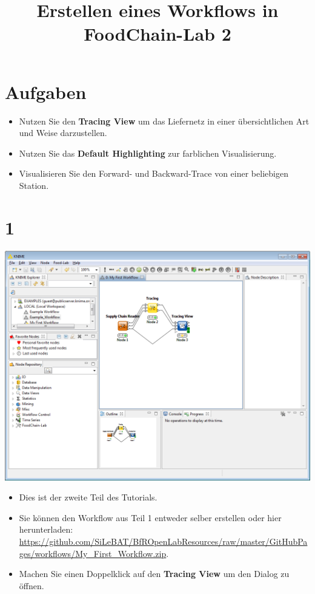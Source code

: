 \documentclass{beamer}
\title{Erstellen eines Workflows in FoodChain-Lab 2}
\date{}
\begin{document}
\maketitle

\section{Aufgaben}
\begin{frame}
	\begin{itemize}
		\item Nutzen Sie den \textbf{Tracing View} um das Liefernetz in einer übersichtlichen Art und Weise darzustellen.
		\item Nutzen Sie das \textbf{Default Highlighting} zur farblichen Visualisierung.
		\item Visualisieren Sie den Forward- und Backward-Trace von einer beliebigen Station.
	\end{itemize}
\end{frame}
 
\section{1}
\begin{frame}
	\begin{center}
  		\includegraphics[height=0.5\textheight]{1.png}
	\end{center}
	\begin{itemize}
		\item Dies ist der zweite Teil des Tutorials.
		\item Sie können den Workflow aus Teil 1 entweder selber erstellen oder hier herunterladen: \url{https://github.com/SiLeBAT/BfROpenLabResources/raw/master/GitHubPages/workflows/My_First_Workflow.zip}.
		\item Machen Sie einen Doppelklick auf den \textbf{Tracing View} um den Dialog zu öffnen.
	\end{itemize}
\end{frame}
\end{document}
